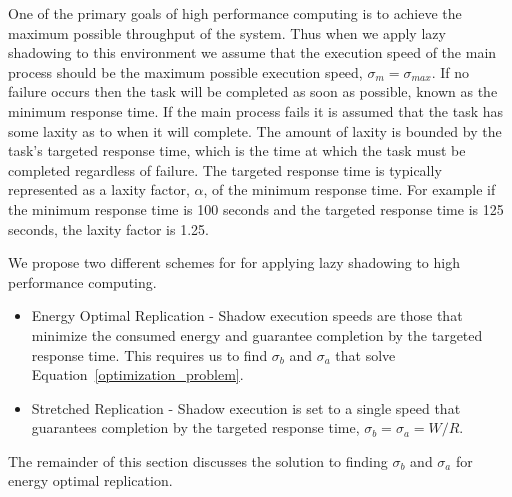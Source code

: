 One of the primary goals of high performance computing is to achieve
the maximum possible throughput of the system. Thus when we
apply lazy shadowing to this environment we assume that the
execution speed of the main process should be the maximum possible
execution speed, $\sigma_m=\sigma_{max}$. If no failure occurs then
the task will be completed as soon as possible, known as the minimum
response time. If the main process fails it is assumed that the task
has some laxity as to when it will complete. The amount of laxity is
bounded by the task's targeted response time, which is the time at
which the task must be completed regardless of failure. The targeted
response time is typically represented as a laxity factor, $\alpha$,
of the minimum response time. For example if the minimum response time
is 100 seconds and the targeted response time is 125 seconds, the
laxity factor is 1.25.

We propose two different schemes for for applying lazy shadowing to
high performance computing.
\begin{itemize}
\item 
Energy Optimal Replication - Shadow execution speeds are those that
minimize the consumed energy and guarantee completion by the targeted
response time. This requires us to find $\sigma_b$ and $\sigma_a$ that
solve Equation~\ref{optimization_problem}.
\item 
Stretched Replication - Shadow execution is set to a single speed that
guarantees completion by the targeted response time, $\sigma_b =
\sigma_a = W/R$.
\end{itemize}
The remainder of this section discusses the solution to finding
$\sigma_b$ and $\sigma_a$ for energy optimal replication. 
 

